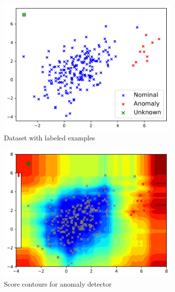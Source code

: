 \documentclass{article} %
\begin{document}
\begin{figure}
	\centering
	\captionsetup{labelformat=empty}
	\begin{subfigure}[b]{0.3\textwidth}
		\includegraphics[width=\textwidth, clip=true, trim=0mm 0mm 0mm 0mm]{avc_dataset}
		\caption{Dataset with labeled examples}
		\label{fig:dataset}
	\end{subfigure}
	\begin{subfigure}[b]{0.3\textwidth}
		\includegraphics[width=\textwidth, clip=true, trim=0mm 0mm 0mm 0mm]{avc_train_anomaly}
		\caption{Score contours for anomaly detector}
		\label{fig:aad}
	\end{subfigure}
    \begin{subfigure}[b]{0.3\textwidth}

\end{subfigure}
\end{figure}
\end{document}
